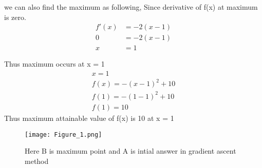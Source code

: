 \begin{enumerate}[label=\thesection.\arabic*.,ref=\thesection.\theenumi]
    
    we can also find the maximum as following, Since derivative of f(x) at maximum is zero.
    \begin{align}
        f'(x) &= -2(x-1) \\
        0 &= -2(x-1) \\
        x &= 1
    \end{align}
    
    Thus maximum occurs at x = 1 \\
    \begin{align}
        x = 1 \\
        f(x) = -(x-1)^2+10 \\
        f(1) = -(1-1)^2+10 \\
        f(1) = 10
    \end{align}
    Thus maximum attainable value of f(x) is 10 at x = 1 
    \begin{figure}[h]
    \texttt{[image: Figure\_1.png]}
    \caption{Here B is maximum point and A is intial answer in gradient ascent method}
    \end{figure}\\

    
    

\end{enumerate}
